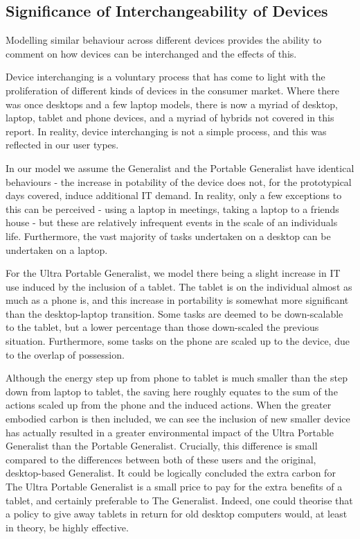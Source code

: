 \documentclass[conference]{IEEEtran}
\begin{document}
\subsection{Significance of Interchangeability of Devices}

Modelling similar behaviour across different devices provides the
ability to comment on how devices can be interchanged and the effects
of this.

Device interchanging is a voluntary process that has come to light
with the proliferation of different kinds of devices in the consumer
market. Where there was once desktops and a few laptop models, there
is now a myriad of desktop, laptop, tablet and phone devices, and a
myriad of hybrids not covered in this report. In reality, device
interchanging is not a simple process, and this was reflected in our
user types.

In our model we assume the Generalist and the Portable Generalist have
identical behaviours - the increase in potability of the device does
not, for the prototypical days covered, induce additional IT
demand. In reality, only a few exceptions to this can be perceived -
using a laptop in meetings, taking a laptop to a friends house - but
these are relatively infrequent events in the scale of an individuals
life. Furthermore, the vast majority of tasks undertaken on a desktop
can be undertaken on a laptop.

For the Ultra Portable Generalist, we model there being a slight
increase in IT use induced by the inclusion of a tablet. The tablet is
on the individual almost as much as a phone is, and this increase in
portability is somewhat more significant than the desktop-laptop
transition. Some tasks are deemed to be down-scalable to the tablet,
but a lower percentage than those down-scaled the previous
situation. Furthermore, some tasks on the phone are scaled up to the
device, due to the overlap of possession.

Although the energy step up from phone to tablet is much smaller than the step down from laptop to tablet, the saving here roughly equates to the sum of the actions scaled up from the phone and the induced actions. When the greater embodied carbon is then included, we can see the inclusion of new smaller device has actually resulted in a greater environmental impact of the Ultra Portable Generalist than the Portable Generalist.
Crucially, this difference is small compared to the differences
between both of these users and the original, desktop-based
Generalist. It could be logically concluded the extra carbon for The
Ultra Portable Generalist is a small price to pay for the extra
benefits of a tablet, and certainly preferable to The
Generalist. Indeed, one could theorise that a policy to give away
tablets in return for old desktop computers would, at least in theory,
be highly effective.
\end{document}

